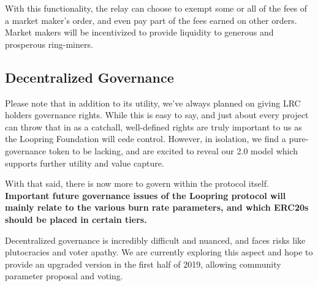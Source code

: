 \documentclass[UTF8,nofonts]{article}
\begin{document}
\begin{multicols}{2}
\begin{appendices}
With this functionality, the relay can choose to exempt some or all of the fees of a market maker’s order, and even pay part of the fees earned on other orders. Market makers will be incentivized to provide liquidity to generous and prosperous ring-miners.

\subsection{Decentralized Governance}
Please note that in addition to its utility, we’ve always planned on giving LRC holders governance rights. While this is easy to say, and just about every project can throw that in as a catchall, well-defined rights are truly important to us as the Loopring Foundation will cede control. However, in isolation, we find a pure-governance token to be lacking, and are excited to reveal our 2.0 model which supports further utility and value capture. 

With that said, there is now more to govern within the protocol itself. \textbf{Important future governance issues of the Loopring protocol will mainly relate to the various burn rate parameters, and which ERC20s should be placed in certain tiers.} 

Decentralized governance is incredibly difficult and nuanced, and faces risks like plutocracies and voter apathy. We are currently exploring this aspect and hope to provide an upgraded version in the first half of 2019, allowing community parameter proposal and voting.

\end{appendices}





\end{multicols}
\end{document}
